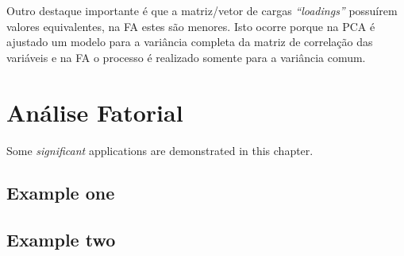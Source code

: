 \documentclass[]{book}
\begin{document}
Outro destaque importante é que a matriz/vetor de cargas
\emph{``loadings''} possuírem valores equivalentes, na FA estes são
menores. Isto ocorre porque na PCA é ajustado um modelo para a variância
completa da matriz de correlação das variáveis e na FA o processo é
realizado somente para a variância comum.

\chapter{Análise Fatorial}\label{FA}

Some \emph{significant} applications are demonstrated in this chapter.

\section{Example one}\label{example-one}

\section{Example two}\label{example-two}


\end{document}
